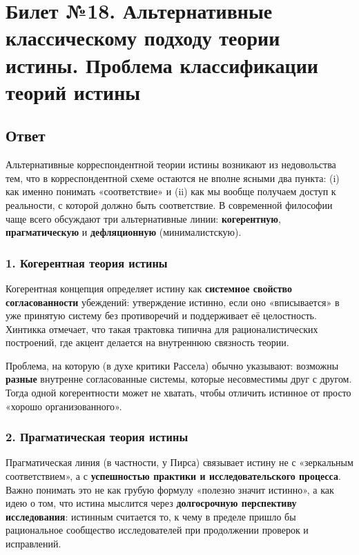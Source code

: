 \documentclass[a4paper,12pt]{article}
\begin{document}
\newpage
\section{Билет №18. Альтернативные классическому подходу теории истины. Проблема классификации теорий истины}

\subsection{Ответ}

Альтернативные корреспондентной теории истины возникают из недовольства тем, что в корреспондентной схеме остаются не вполне ясными два пункта: (i) как именно понимать «соответствие» и (ii) как мы вообще получаем доступ к реальности, с которой должно быть соответствие. В современной философии чаще всего обсуждают три альтернативные линии: \textbf{когерентную}, \textbf{прагматическую} и \textbf{дефляционную} (минималистскую).

\subsubsection*{1. Когерентная теория истины}

Когерентная концепция определяет истину как \textbf{системное свойство согласованности} убеждений: утверждение истинно, если оно «вписывается» в уже принятую систему без противоречий и поддерживает её целостность. Хинтикка отмечает, что такая трактовка типична для рационалистических построений, где акцент делается на внутреннюю связность теории.

Проблема, на которую (в духе критики Рассела) обычно указывают: возможны \textbf{разные} внутренне согласованные системы, которые несовместимы друг с другом. Тогда одной когерентности может не хватать, чтобы отличить истинное от просто «хорошо организованного».

\subsubsection*{2. Прагматическая теория истины}

Прагматическая линия (в частности, у Пирса) связывает истину не с «зеркальным соответствием», а с \textbf{успешностью практики и исследовательского процесса}. Важно понимать это не как грубую формулу «полезно значит истинно», а как идею о том, что истина мыслится через \textbf{долгосрочную перспективу исследования}: истинным считается то, к чему в пределе пришло бы рациональное сообщество исследователей при продолжении проверок и исправлений.
\end{document}
